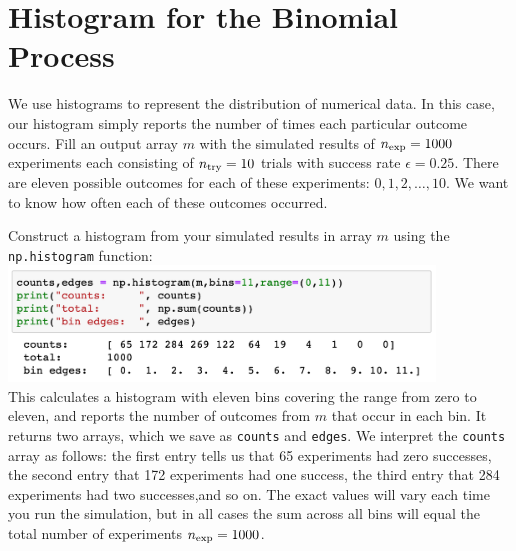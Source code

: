 \section{Histogram for the Binomial Process}

We use histograms to represent the distribution of numerical data.  In
this case, our histogram simply reports the number of times each particular outcome
occurs.  Fill an output array $m$ with the simulated results of $n_{\rm exp} =
1000$ experiments each consisting of $n_{\rm try}=10$ trials with
success rate $\epsilon=0.25$.  There are eleven possible outcomes for
each of these experiments: $0,1,2,\ldots,10$.  We want to know how
often each of these outcomes occurred.

Construct a histogram from your simulated results in array $m$ using the 
{\tt np.histogram} function:\\ 
\includegraphics[width=0.85\textwidth]{figs/labs/distributions/makehist.png}\\ 
This calculates a histogram with eleven bins covering the range
from zero to eleven, and reports the number of outcomes from $m$ that
occur in each bin.  It returns two arrays, which we save as 
{\tt counts} and {\tt edges}.  We interpret the {\tt counts} array as
follows: the first entry tells us that 65 experiments had zero
successes, the second entry that 172 experiments had one success, the
third entry that 284 experiments had two successes,and so on.  The
exact values will vary each time you run the simulation, but in all
cases the sum across all bins will equal the total number of
experiments $n_{\rm exp} = 1000$.

